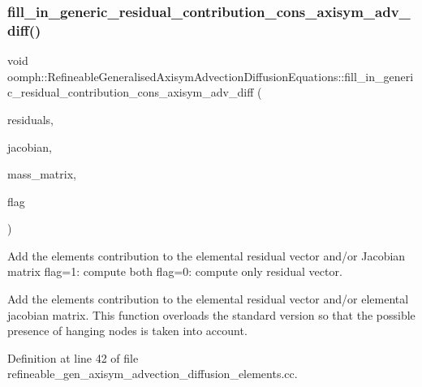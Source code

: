 \subsubsection{\texorpdfstring{fill\+\_\+in\+\_\+generic\+\_\+residual\+\_\+contribution\+\_\+cons\+\_\+axisym\+\_\+adv\+\_\+diff()}{fill\_in\_generic\_residual\_contribution\_cons\_axisym\_adv\_diff()}}
{\footnotesize\ttfamily void oomph\+::\+Refineable\+Generalised\+Axisym\+Advection\+Diffusion\+Equations\+::fill\+\_\+in\+\_\+generic\+\_\+residual\+\_\+contribution\+\_\+cons\+\_\+axisym\+\_\+adv\+\_\+diff (\begin{DoxyParamCaption}\item[{\hyperlink{classoomph_1_1Vector}{Vector}$<$ double $>$ \&}]{residuals,  }\item[{\hyperlink{classoomph_1_1DenseMatrix}{Dense\+Matrix}$<$ double $>$ \&}]{jacobian,  }\item[{\hyperlink{classoomph_1_1DenseMatrix}{Dense\+Matrix}$<$ double $>$ \&}]{mass\+\_\+matrix,  }\item[{unsigned}]{flag }\end{DoxyParamCaption})\hspace{0.3cm}{\ttfamily [protected]}}



Add the element\textquotesingle{}s contribution to the elemental residual vector and/or Jacobian matrix flag=1\+: compute both flag=0\+: compute only residual vector. 

Add the element\textquotesingle{}s contribution to the elemental residual vector and/or elemental jacobian matrix. This function overloads the standard version so that the possible presence of hanging nodes is taken into account. 

Definition at line 42 of file refineable\+\_\+gen\+\_\+axisym\+\_\+advection\+\_\+diffusion\+\_\+elements.\+cc.



